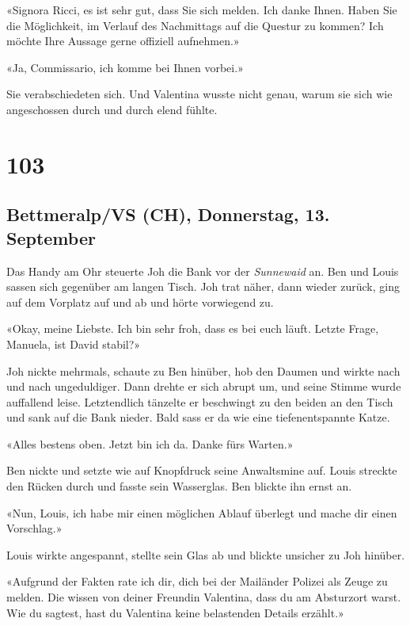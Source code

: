 «Signora Ricci, es ist sehr gut, dass Sie sich melden. Ich danke Ihnen.
Haben Sie die Möglichkeit, im Verlauf des Nachmittags auf die Questur zu
kommen? Ich möchte Ihre Aussage gerne offiziell aufnehmen.»

«Ja, Commissario, ich komme bei Ihnen vorbei.»

Sie verabschiedeten sich. Und Valentina wusste nicht genau, warum sie
sich wie angeschossen durch und durch elend fühlte.

\chapter{103}\label{section-103}

\section{Bettmeralp/VS (CH), Donnerstag, 13.
September}\label{bettmeralpvs-ch-donnerstag-13.-september}

Das Handy am Ohr steuerte Joh die Bank vor der \emph{Sunnewaid} an. Ben
und Louis sassen sich gegenüber am langen Tisch. Joh trat näher, dann
wieder zurück, ging auf dem Vorplatz auf und ab und hörte vorwiegend zu.

«Okay, meine Liebste. Ich bin sehr froh, dass es bei euch läuft. Letzte
Frage, Manuela, ist David stabil?»

Joh nickte mehrmals, schaute zu Ben hinüber, hob den Daumen und wirkte
nach und nach ungeduldiger. Dann drehte er sich abrupt um, und seine
Stimme wurde auffallend leise. Letztendlich tänzelte er beschwingt zu
den beiden an den Tisch und sank auf die Bank nieder. Bald sass er da
wie eine tiefenentspannte Katze.

«Alles bestens oben. Jetzt bin ich da. Danke fürs Warten.»

Ben nickte und setzte wie auf Knopfdruck seine Anwaltsmine auf. Louis
streckte den Rücken durch und fasste sein Wasserglas. Ben blickte ihn
ernst an.

«Nun, Louis, ich habe mir einen möglichen Ablauf überlegt und mache dir
einen Vorschlag.»

Louis wirkte angespannt, stellte sein Glas ab und blickte unsicher zu
Joh hinüber.

«Aufgrund der Fakten rate ich dir, dich bei der Mailänder Polizei als
Zeuge zu melden. Die wissen von deiner Freundin Valentina, dass du am
Absturzort warst. Wie du sagtest, hast du Valentina keine belastenden
Details erzählt.»


